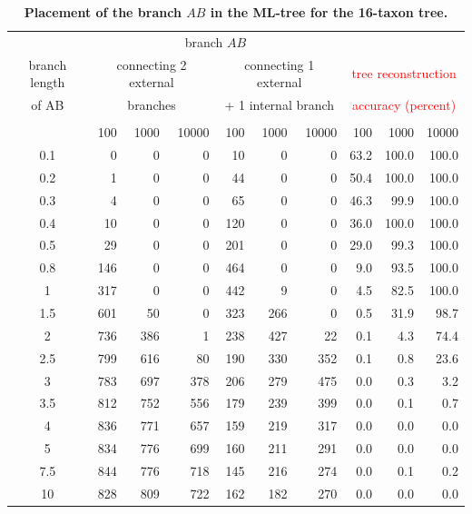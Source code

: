 \begin{appendices}
\begin{table}[hb]
    \centering
    \begin{tabular}{|c|rrr|rrr|rrr|}
\hline
 & \multicolumn{6}{c|}{branch $AB$}&\multicolumn{3}{c|}{}\\
 branch length &\multicolumn{3}{c|}{connecting 2 external } &\multicolumn{3}{c|}{connecting 1 external}&\multicolumn{3}{c|}{\textcolor{red}{tree reconstruction}}\\
 of AB &\multicolumn{3}{c|}{branches } 
 &\multicolumn{3}{c|}{+ 1 internal branch} &\multicolumn{3}{c|}{\textcolor{red}{accuracy (percent)}}\\
 & & & & & & & & & \\
 &100 & 1000 & 10000 &100 &1000 &10000 &100 & 1000 & 10000 \\
\hline
0.1&   0&   0&   0&  10&   0&   0&    63.2&  100.0&  100.0 \\
0.2&   1&   0&   0&  44&   0&   0&  50.4&  100.0&  100.0 \\
0.3&   4&   0&   0&  65&   0&   0&  46.3&   99.9&  100.0 \\
0.4&  10&   0&   0& 120&   0&   0&  36.0&  100.0&  100.0 \\
0.5&  29&   0&   0& 201&   0&   0&  29.0&   99.3&  100.0 \\
0.8& 146&   0&   0& 464&   0&   0&     9.0&   93.5&  100.0 \\
  1& 317&   0&   0& 442&   9&   0&   4.5&   82.5&  100.0 \\
1.5& 601&  50&   0& 323& 266&   0&   0.5&   31.9&   98.7 \\
  2& 736& 386&   1& 238& 427&  22&    0.1&    4.3&   74.4 \\
2.5& 799& 616&  80& 190& 330& 352&   0.1&    0.8&   23.6 \\
  3& 783& 697& 378& 206& 279& 475&   0.0&    0.3&    3.2 \\
3.5& 812& 752& 556& 179& 239& 399&   0.0&    0.1&    0.7 \\
  4& 836& 771& 657& 159& 219& 317&   0.0&    0.0&    0.0 \\
  5& 834& 776& 699& 160& 211& 291&   0.0&    0.0&    0.0 \\
7.5& 844& 776& 718& 145& 216& 274&   0.0&    0.1&    0.2 \\
 10& 828& 809& 722& 162& 182& 270&   0.0&    0.0&    0.0 \\
\hline
    \end{tabular}
    \vspace{0.25cm}
    \caption{
        \textbf{Placement of the  branch $AB$ in the ML-tree for the 16-taxon tree.}
}
\end{table}
\end{appendices}
